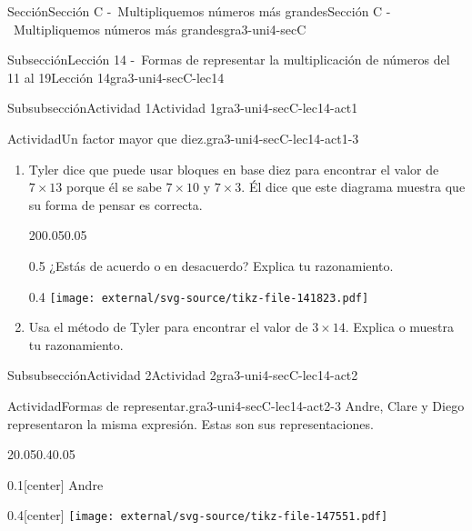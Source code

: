 \documentclass[twoside,14pt,]{extarticle}
\begin{document}
\begin{sectionptx}{Sección}{Sección C -~Multipliquemos números más grandes}{}{Sección C -~Multipliquemos números más grandes}{}{}{gra3-uni4-secC}
\begin{subsectionptx}{Subsección}{Lección 14 -~Formas de representar la multiplicación de números del 11 al 19}{}{Lección 14}{}{}{gra3-uni4-secC-lec14}
%
%
\typeout{************************************************}
\typeout{************************************************}
%
\begin{subsubsectionptx}{Subsubsección}{Actividad 1}{}{Actividad 1}{}{}{gra3-uni4-secC-lec14-act1}
\begin{activity}{Actividad}{Un factor mayor que diez.}{gra3-uni4-secC-lec14-act1-3}%
%
\begin{enumerate}
\item{}Tyler dice que puede usar bloques en base diez para encontrar el valor de \(7\times 13\) porque él se sabe \(7\times 10\) y \(7\times 3\). Él dice que este diagrama muestra que su forma de pensar es correcta.%
\begin{sidebyside}{2}{0}{0.05}{0.05}%
\begin{sbspanel}{0.5}%
¿Estás de acuerdo o en desacuerdo? Explica tu razonamiento.%
\end{sbspanel}%
\begin{sbspanel}{0.4}%
\texttt{[image: external/svg-source/tikz-file-141823.pdf]}
\end{sbspanel}%
\end{sidebyside}%
\item{}Usa el método de Tyler para encontrar el valor de  \(3\times 14\). Explica o muestra tu razonamiento.%
\end{enumerate}
\end{activity}%
\end{subsubsectionptx}
%
%
\typeout{************************************************}
\typeout{************************************************}
%
\begin{subsubsectionptx}{Subsubsección}{Actividad 2}{}{Actividad 2}{}{}{gra3-uni4-secC-lec14-act2}
\begin{activity}{Actividad}{Formas de representar.}{gra3-uni4-secC-lec14-act2-3}%
Andre, Clare y Diego representaron la misma expresión. Estas son sus representaciones.%
\begin{sidebyside}{2}{0.05}{0.4}{0.05}%
\begin{sbspanel}{0.1}[center]%
Andre%
\end{sbspanel}%
\begin{sbspanel}{0.4}[center]%
\texttt{[image: external/svg-source/tikz-file-147551.pdf]}
\end{sbspanel}%
\end{sidebyside}%

\end{activity}
\end{subsubsectionptx}
\end{subsectionptx}
\end{sectionptx}
\end{document}
